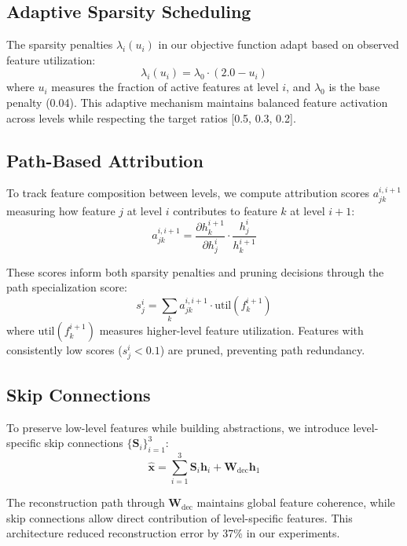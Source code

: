 \documentclass{article} %
\begin{document}
\subsection{Adaptive Sparsity Scheduling}
The sparsity penalties $\lambda_i(u_i)$ in our objective function adapt based on observed feature utilization:
\begin{equation}
    \lambda_i(u_i) = \lambda_0 \cdot (2.0 - u_i)
\end{equation}
where $u_i$ measures the fraction of active features at level $i$, and $\lambda_0$ is the base penalty (0.04). This adaptive mechanism maintains balanced feature activation across levels while respecting the target ratios [0.5, 0.3, 0.2].

\subsection{Path-Based Attribution}
To track feature composition between levels, we compute attribution scores $a_{jk}^{i,i+1}$ measuring how feature $j$ at level $i$ contributes to feature $k$ at level $i+1$:
\begin{equation}
    a_{jk}^{i,i+1} = \frac{\partial h_k^{i+1}}{\partial h_j^i} \cdot \frac{h_j^i}{h_k^{i+1}}
\end{equation}

These scores inform both sparsity penalties and pruning decisions through the path specialization score:
\begin{equation}
    s_j^i = \sum_{k} a_{jk}^{i,i+1} \cdot \text{util}(f_k^{i+1})
\end{equation}
where $\text{util}(f_k^{i+1})$ measures higher-level feature utilization. Features with consistently low scores ($s_j^i < 0.1$) are pruned, preventing path redundancy.

\subsection{Skip Connections}
To preserve low-level features while building abstractions, we introduce level-specific skip connections $\{\mathbf{S}_i\}_{i=1}^3$:
\begin{equation}
    \hat{\mathbf{x}} = \sum_{i=1}^3 \mathbf{S}_i\mathbf{h}_i + \mathbf{W}_\text{dec}\mathbf{h}_1
\end{equation}

The reconstruction path through $\mathbf{W}_\text{dec}$ maintains global feature coherence, while skip connections allow direct contribution of level-specific features. This architecture reduced reconstruction error by 37\% in our experiments.
\end{document}
